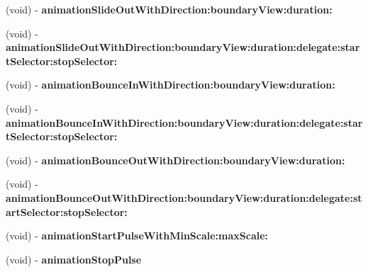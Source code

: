 \begin{DoxyCompactItemize}
\item 
\hypertarget{category_u_i_view_07_t_x_s_animations_08_a17af0a203109cbb7448966710d8056ab}{}(void) -\/ {\bfseries animation\+Slide\+Out\+With\+Direction\+:boundary\+View\+:duration\+:}\label{category_u_i_view_07_t_x_s_animations_08_a17af0a203109cbb7448966710d8056ab}

\item 
\hypertarget{category_u_i_view_07_t_x_s_animations_08_a9629135abb845481161ae80f6a4da3f0}{}(void) -\/ {\bfseries animation\+Slide\+Out\+With\+Direction\+:boundary\+View\+:duration\+:delegate\+:start\+Selector\+:stop\+Selector\+:}\label{category_u_i_view_07_t_x_s_animations_08_a9629135abb845481161ae80f6a4da3f0}

\item 
\hypertarget{category_u_i_view_07_t_x_s_animations_08_acefa13a110a26e54915696f562c53cdf}{}(void) -\/ {\bfseries animation\+Bounce\+In\+With\+Direction\+:boundary\+View\+:duration\+:}\label{category_u_i_view_07_t_x_s_animations_08_acefa13a110a26e54915696f562c53cdf}

\item 
\hypertarget{category_u_i_view_07_t_x_s_animations_08_acf315af56b67b0d152c0e36c00c2c27f}{}(void) -\/ {\bfseries animation\+Bounce\+In\+With\+Direction\+:boundary\+View\+:duration\+:delegate\+:start\+Selector\+:stop\+Selector\+:}\label{category_u_i_view_07_t_x_s_animations_08_acf315af56b67b0d152c0e36c00c2c27f}

\item 
\hypertarget{category_u_i_view_07_t_x_s_animations_08_aff813e9da52c468bf138f3a8b9483de7}{}(void) -\/ {\bfseries animation\+Bounce\+Out\+With\+Direction\+:boundary\+View\+:duration\+:}\label{category_u_i_view_07_t_x_s_animations_08_aff813e9da52c468bf138f3a8b9483de7}

\item 
\hypertarget{category_u_i_view_07_t_x_s_animations_08_a05d800530806f9ec1255b1e57ed5c203}{}(void) -\/ {\bfseries animation\+Bounce\+Out\+With\+Direction\+:boundary\+View\+:duration\+:delegate\+:start\+Selector\+:stop\+Selector\+:}\label{category_u_i_view_07_t_x_s_animations_08_a05d800530806f9ec1255b1e57ed5c203}

\item 
\hypertarget{category_u_i_view_07_t_x_s_animations_08_a2ee1a593993a469c3fe1c562731dc77f}{}(void) -\/ {\bfseries animation\+Start\+Pulse\+With\+Min\+Scale\+:max\+Scale\+:}\label{category_u_i_view_07_t_x_s_animations_08_a2ee1a593993a469c3fe1c562731dc77f}

\item 
\hypertarget{category_u_i_view_07_t_x_s_animations_08_acf02cbae6bd8a58c75afd206fb72d8b7}{}(void) -\/ {\bfseries animation\+Stop\+Pulse}\label{category_u_i_view_07_t_x_s_animations_08_acf02cbae6bd8a58c75afd206fb72d8b7}


\end{DoxyCompactItemize}
